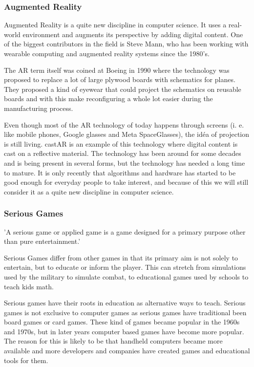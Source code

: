 \subsubsection{Augmented Reality}

\gls{Augmented Reality} is a quite new discipline in computer science. It uses
a real-world environment and augments its perspective by adding digital content. 
One of the biggest contributors in the field is Steve Mann, who has been
working with wearable computing and augmented reality systems since the 1980's.

The \gls{AR} term itself was coined at Boeing\cite{boeingAR} in 1990 where the
technology was
proposed to replace a lot of large plywood boards with schematics for planes.
They proposed a kind of eyewear that could project the schematics on reusable
boards and with this make reconfiguring a whole lot easier during the
manufacturing process.

Even though most of the AR technology of today happens through screens (i. e. like
mobile phones, Google glasses\cite{GoogleGlasses} and Meta SpaceGlasses\cite{MetaSpaceGlasses}),
the id\'{e}a of projection is still living. castAR is an example of this 
technology where digital content is cast on a reflective material.
The technology has been around for some decades and is being present in several
forms, but the technology has needed a long time to mature. It is only recently
that algorithms and hardware has started to be good enough for everyday people
to take interest, and because of this we will still consider it as a quite new 
discipline in computer science.

\subsubsection{Serious Games}

'A serious game or applied game is a game designed for a primary purpose other than pure entertainment.'\cite{wiki:SeriousGames}

Serious Games differ from other games in that its primary aim is not solely to entertain, but to educate or inform the player.
This can stretch from simulations used by the military to simulate combat, to educational games used by schools to teach kids math.

Serious games have their roots in education as alternative ways to teach.
Serious games is not exclusive to computer games as serious games have traditional been board games or card games.
These kind of games became popular in the 1960s and 1970s, but in later years computer based games have become more 
popular. The reason for this is likely to be that handheld computers became more available and more developers and companies have created games and educational tools for them.

